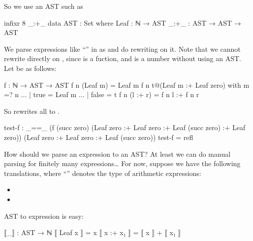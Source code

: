 \documentclass{article}
\begin{document}
So we use an AST such as

\begin{code}
infixr 8 _:+_
data AST : Set where
  Leaf : ℕ → AST
  _:+_ : AST → AST → AST
\end{code}
  
We parse expressions like ``'' in as  \AgdaOperator{\AgdaInductiveConstructor{:+}}  and do rewriting on it. Note that we cannot rewrite directly on  \AgdaOperator{\AgdaFunction{+}} , since \AgdaFunction{\AgdaUnderscore{}+\AgdaUnderscore{}} is a fuction, and  \AgdaOperator{\AgdaFunction{+}}  is a number without using an AST. Let  be as follows:

\begin{code}
f : ℕ → AST → AST
f n (Leaf m) = Leaf m
f n t@(Leaf m :+ Leaf zero) with m =? n
... | true = Leaf m
... | false = t
f n (l :+ r) = f n l :+ f n r
\end{code}

So   rewrites all   \AgdaOperator{\AgdaInductiveConstructor{:+}}   to  .

\begin{code}
test-f : _==_ (f (succ zero) (Leaf zero :+ Leaf zero :+ Leaf (succ zero) :+ Leaf zero))
              (Leaf zero :+ Leaf zero :+ Leaf (succ zero))
test-f = refl
\end{code}

How should we parse an expression to an AST? At least we can do manual parsing for finitely many expressions\ldots{} For now, suppose we have the following translations, where ``'' denotes the type of arithmetic expressions:

\begin{itemize}
\item \AgdaFunction{[\AgdaUnderscore{}]} \AgdaSymbol{:}   
\item {} \AgdaSymbol{:}   
\end{itemize}

AST to expression is easy:

\begin{code}
⟦_⟧ : AST → ℕ
⟦ Leaf x ⟧ = x
⟦ x :+ x₁ ⟧ = ⟦ x ⟧ + ⟦ x₁ ⟧
\end{code}
\end{document}
